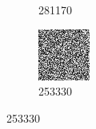 \begin{figure}[H]
\begin{subfigure}[b]{0.2\linewidth}
      \caption{281170}
      \label{pic:abkühl_schritt_2}
    \end{subfigure}
    \begin{subfigure}[b]{0.2\linewidth}
        \includegraphics[width=\linewidth]{content/simulatedAnnealing/Bilder/Annealing/intermediate_applied_permutation_3_quasieqstepKirkpatrickCooldownSchedule_energy_253330-RGBA_r_channel.png}
         \caption{253330}
         \label{pic:abkühl_schritt_3}
      \end{subfigure}



\end{figure}
